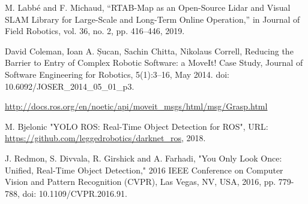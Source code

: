 \documentclass[conference,a4paper]{IEEEtran}
\begin{document}
%
%
%
\begin{thebibliography}{1}

M. Labbé and F. Michaud, “RTAB-Map as an Open-Source Lidar and Visual SLAM Library for Large-Scale and Long-Term Online Operation,” in Journal of Field Robotics, vol. 36, no. 2, pp. 416–446, 2019. 

David Coleman, Ioan A. Șucan, Sachin Chitta, Nikolaus Correll, Reducing the Barrier to Entry of Complex Robotic Software: a MoveIt! Case Study, Journal of Software Engineering for Robotics, 5(1):3–16, May 2014. doi: 10.6092/JOSER\_2014\_05\_01\_p3.

\url{http://docs.ros.org/en/noetic/api/moveit_msgs/html/msg/Grasp.html}

M. Bjelonic "YOLO ROS: Real-Time Object Detection for ROS", URL: \url{https://github.com/leggedrobotics/darknet_ros}, 2018.

J. Redmon, S. Divvala, R. Girshick and A. Farhadi, "You Only Look Once: Unified, Real-Time Object Detection," 2016 IEEE Conference on Computer Vision and Pattern Recognition (CVPR), Las Vegas, NV, USA, 2016, pp. 779-788, doi: 10.1109/CVPR.2016.91.

\end{thebibliography}




\end{document}

